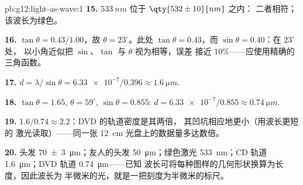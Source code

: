 \begin{solution}{pb:g12:light-as-wave:1}
\textbf{15.} $\qty{533}{nm}$ 位于 $\qty{532 \pm 10}{nm}$ 之内：
二者相符；该波长为绿色。

\textbf{16.} $\tan\theta = 0.43/1.00$，故 $\theta = 23^\circ$。此处
$\tan\theta = 0.43$，而 $\sin\theta = 0.40$：在 $23^\circ$ 处，
以小角近似把 $\sin$、$\tan$ 与 $\theta$ 视为相等，误差
接近 $10\%$——应使用精确的三角函数。

\textbf{17.} $d = \lambda/\sin\theta = \num{6.33e-7}/0.396 \approx
\qty{1.6}{\micro m}$.

\textbf{18.} $\tan\theta = 1.65$, $\theta = 59^\circ$,
$\sin\theta = 0.855$: $d = \num{6.33e-7}/0.855 \approx
\qty{0.74}{\micro m}$.

\textbf{19.} $1.6/0.74 \approx 2.2$：DVD 的轨道密度是其两倍，
其凹坑相应地更小（用波长更短的
激光读取）——同一张
\qty{12}{cm} 光盘上的数据量多达数倍。

\textbf{20.} 头发 \qty{70 \pm 3}{\micro m}；友人的头发
\qty{50}{\micro m}；绿色激光 \qty{533}{nm}；CD 轨道
\qty{1.6}{\micro m}；DVD 轨道 \qty{0.74}{\micro m}——已知
波长可将每种图样的几何形状换算为长度，因此波长为
半微米的光，就是一把刻度为半微米的标尺。
\end{solution}
